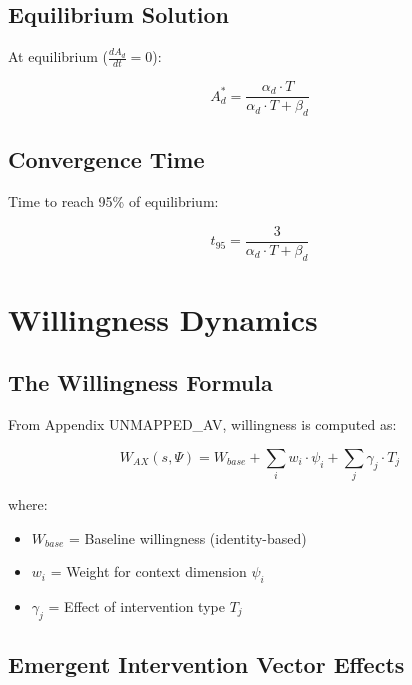\subsection{Equilibrium Solution}

At equilibrium ($\frac{dA_d}{dt} = 0$):

\begin{equation}
A_d^* = \frac{\alpha_d \cdot T}{\alpha_d \cdot T + \beta_d}
\label{eq:awareness-equilibrium}
\end{equation}

\subsection{Convergence Time}

Time to reach 95\% of equilibrium:

\begin{equation}
t_{95} = \frac{3}{\alpha_d \cdot T + \beta_d}
\label{eq:convergence-time}
\end{equation}


\section{Willingness Dynamics}
\label{sec:calc-willingness}

\subsection{The Willingness Formula}

From Appendix UNMAPPED_AV, willingness is computed as:

\begin{equation}
\boxed{
W_{AX}(s, \Psi) = W_{base} + \sum_{i} w_i \cdot \psi_i + \sum_{j} \gamma_j \cdot T_j
}
\label{eq:willingness}
\end{equation}

where:
\begin{itemize}
\item $W_{base}$ = Baseline willingness (identity-based)
\item $w_i$ = Weight for context dimension $\psi_i$
\item $\gamma_j$ = Effect of intervention type $T_j$
\end{itemize}

\subsection{Emergent Intervention Vector Effects}

